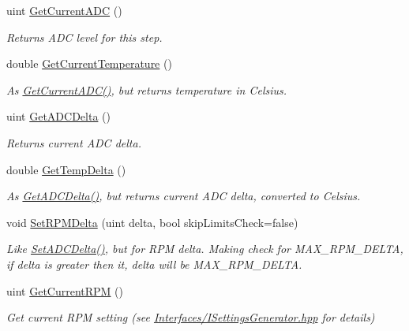 \begin{DoxyCompactItemize}
uint \hyperlink{class_settings_step_a443f5643d9b547632c261c5f3a4288f1}{Get\+Current\+A\+DC} ()
\begin{DoxyCompactList}\small\item\em Returns A\+DC level for this step. \end{DoxyCompactList}\item 
double \hyperlink{class_settings_step_a78ec872aa61713e3df36e93f56804afe}{Get\+Current\+Temperature} ()
\begin{DoxyCompactList}\small\item\em As \hyperlink{class_settings_step_a443f5643d9b547632c261c5f3a4288f1}{Get\+Current\+A\+D\+C()}, but returns temperature in Celsius. \end{DoxyCompactList}\item 
uint \hyperlink{class_settings_step_aee30aaa97692d6b546e9dd002900f52e}{Get\+A\+D\+C\+Delta} ()
\begin{DoxyCompactList}\small\item\em Returns current A\+DC delta. \end{DoxyCompactList}\item 
double \hyperlink{class_settings_step_a8162810e5ce2df99053ac5722acc0901}{Get\+Temp\+Delta} ()
\begin{DoxyCompactList}\small\item\em As \hyperlink{class_settings_step_aee30aaa97692d6b546e9dd002900f52e}{Get\+A\+D\+C\+Delta()}, but returns current A\+DC delta, converted to Celsius. \end{DoxyCompactList}\item 
void \hyperlink{class_settings_step_a25ddaf1d4d77727b8f87b5f8588f2de1}{Set\+R\+P\+M\+Delta} (uint delta, bool skip\+Limits\+Check=false)
\begin{DoxyCompactList}\small\item\em Like \hyperlink{class_settings_step_a8124c87ae0b1d9fb3b623144d0e492db}{Set\+A\+D\+C\+Delta()}, but for R\+PM delta. Making check for M\+A\+X\+\_\+\+R\+P\+M\+\_\+\+D\+E\+L\+TA, if delta is greater then it, delta will be M\+A\+X\+\_\+\+R\+P\+M\+\_\+\+D\+E\+L\+TA. \end{DoxyCompactList}\item 
uint \hyperlink{class_settings_step_aaba560b593af9bc96eeed3db01a469f4}{Get\+Current\+R\+PM} ()
\begin{DoxyCompactList}\small\item\em Get current R\+PM setting (see \hyperlink{_i_settings_generator_8hpp_source}{Interfaces/\+I\+Settings\+Generator.\+hpp} for details) \end{DoxyCompactList}\item 

\end{DoxyCompactItemize}
